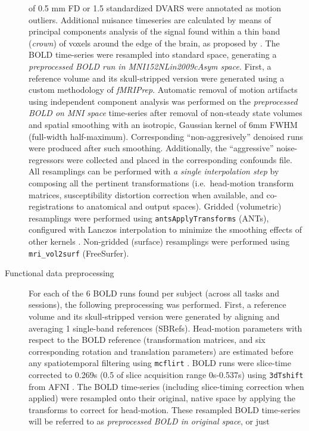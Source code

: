 \documentclass[
]{article}
\begin{document}
\begin{description}
of 0.5 mm FD or 1.5 standardized DVARS were annotated as motion
outliers. Additional nuisance timeseries are calculated by means of
principal components analysis of the signal found within a thin band
(\emph{crown}) of voxels around the edge of the brain, as proposed by
\citep{patriat_improved_2017}. The BOLD time-series were resampled into
standard space, generating a \emph{preprocessed BOLD run in
MNI152NLin2009cAsym space}. First, a reference volume and its
skull-stripped version were generated using a custom methodology of
\emph{fMRIPrep}. Automatic removal of motion artifacts using independent
component analysis \citep[ICA-AROMA,][]{aroma} was performed on the
\emph{preprocessed BOLD on MNI space} time-series after removal of
non-steady state volumes and spatial smoothing with an isotropic,
Gaussian kernel of 6mm FWHM (full-width half-maximum). Corresponding
``non-aggresively'' denoised runs were produced after such smoothing.
Additionally, the ``aggressive'' noise-regressors were collected and
placed in the corresponding confounds file. All resamplings can be
performed with \emph{a single interpolation step} by composing all the
pertinent transformations (i.e.~head-motion transform matrices,
susceptibility distortion correction when available, and
co-registrations to anatomical and output spaces). Gridded (volumetric)
resamplings were performed using \texttt{antsApplyTransforms} (ANTs),
configured with Lanczos interpolation to minimize the smoothing effects
of other kernels \citep{lanczos}. Non-gridded (surface) resamplings were
performed using \texttt{mri\_vol2surf} (FreeSurfer).
\item[Functional data preprocessing]
For each of the 6 BOLD runs found per subject (across all tasks and
sessions), the following preprocessing was performed. First, a reference
volume and its skull-stripped version were generated by aligning and
averaging 1 single-band references (SBRefs). Head-motion parameters with
respect to the BOLD reference (transformation matrices, and six
corresponding rotation and translation parameters) are estimated before
any spatiotemporal filtering using \texttt{mcflirt} \citep[FSL
6.0.5.1:57b01774,][]{mcflirt}. BOLD runs were slice-time corrected to
0.269s (0.5 of slice acquisition range 0s-0.537s) using
\texttt{3dTshift} from AFNI \citep[RRID:SCR\_005927]{afni}. The BOLD
time-series (including slice-timing correction when applied) were
resampled onto their original, native space by applying the transforms
to correct for head-motion. These resampled BOLD time-series will be
referred to as \emph{preprocessed BOLD in original space}, or just

\end{description}
\end{document}
